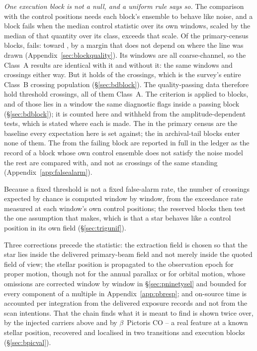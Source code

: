 \emph{One execution block is not a null, and a uniform rule says so.}
The comparison with the control positions needs each block's ensemble to behave
like noise, and a block fails when the median control statistic over its own
windows, scaled by the median of that quantity over its class, exceeds
\BqFactor{} that scale. Of the \BqNBlocks{} primary-census blocks, \BqNFail{} fails:
\BqFailBlock{} toward \BqFailStar, by a margin that does not depend on where
the line was drawn (Appendix~\ref{sec:blockquality}).
Its \BqFailNWin{} windows are all coarse-channel, so the Class~A
results are identical with it and without it: the same \BqWinACut{} windows
and \BqXrossACut{} crossings either way. But it holds \BqFailNCross{} of the
\NCross{} crossings, which is the survey's entire Class~B crossing
population (\S\ref{sec:bdblock}). The quality-passing data therefore hold
\EvNCrossQp{} threshold crossings, all of them Class~A. The criterion is
applied to blocks, and \BkFlagNCrossOther{} of those \EvNCrossQp{} lies in a
window the same diagnostic flags inside a passing block
(\S\ref{sec:bdblock}); it is counted here and withheld from the
amplitude-dependent tests, which is stated where each is made. The
\CkNCrossCenA{} in the primary census are the baseline every
expectation here is set against; the \CeNTailCrossWord{} in archival-tail blocks enter none of them.
The \BqFailNCross{} from the failing block are
reported in full in the ledger as the record of a block whose own control
ensemble does not satisfy the noise model the rest are compared with, and not
as crossings of the same standing (Appendix~\ref{app:falsealarm}).

Because a fixed threshold is not a fixed false-alarm rate, the number of
crossings expected by chance is computed window by window, from the
exceedance rate measured at each window's own control positions; the reserved
blocks then test the one assumption that makes, which is that a star behaves
like a control position in its own field (\S\ref{sec:trigunif}).

Three corrections precede the statistic: the extraction field is chosen so
that the star lies inside the delivered primary-beam field and not merely
inside the quoted field of view; the stellar position is propagated to the
observation epoch for proper motion, though not for the annual parallax or
for orbital motion, whose omissions are corrected window by window in
\S\ref{sec:pninetysel} and bounded for every component of a multiple in
Appendix~\ref{app:pbresp}; and on-source time is accounted per integration
from the
delivered exposure records and not from the scan intentions. That the
chain finds what it is meant to find is shown twice over, by the injected
carriers above and by $\beta$~Pictoris CO -- a real feature at a known
stellar position, recovered and localised in two transitions and
\NStageOneBpicEb{} execution blocks (\S\ref{sec:bpicval}).

